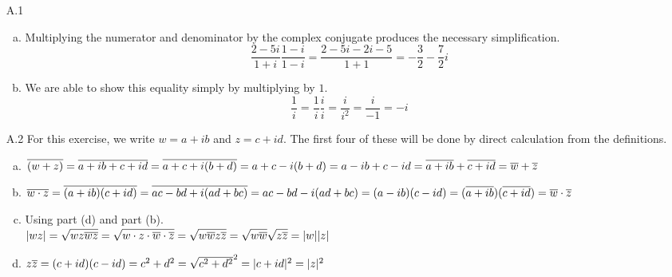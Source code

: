 \documentclass[../../Solutions.tex]{subfiles}
\begin{document}
\begin{itemize}
	\item [A.1]
		\begin{enumerate}[(a)]
			\item Multiplying the numerator and denominator by the complex conjugate produces the necessary simplification.
			$$ \frac{2-5i}{1+i}\frac{1-i}{1-i} = \frac{2-5i-2i-5}{1+1} = -\frac{3}{2}-\frac{7}{2}i $$
			
			\item We are able to show this equality simply by multiplying by $1$.
			$$ \frac{1}{i} = \frac{1}{i}\frac{i}{i} = \frac{i}{i^2} = \frac{i}{-1} = -i $$
		\end{enumerate}
		
	\item [A.2] For this exercise, we write $w = a+ib$ and $z = c+id$.
	The first four of these will be done by direct calculation from the definitions.
		\begin{enumerate}[(a)]
			\item $\overline{(w+z)} = \overline{a+ib+c+id} = \overline{a+c+i(b+d)} = a+c-i(b+d) = a-ib+c-id = \overline{a+ib}+\overline{c+id} = \overline{w}+\overline{z}$
			
			\item $\overline{w \cdot z} = \overline{(a+ib)(c+id)} = \overline{ac-bd+i(ad+bc)} = ac-bd-i(ad+bc) = (a-ib)(c-id) = (\overline{a+ib})(\overline{c+id}) = \overline{w} \cdot \overline{z}$
			
			\item Using part (d) and part (b). \\
			$|wz| = \sqrt{wz \overline{wz}} = \sqrt{w \cdot z \cdot \overline{w} \cdot \overline{z}} = \sqrt{w\overline{w}z\overline{z}} = \sqrt{w\overline{w}}\sqrt{z\overline{z}} = |w||z|$
			
			\item $z\overline{z} = (c+id)(c-id) = c^2+d^2 = \sqrt{c^2+d^2}^2 = |c+id|^2 = |z|^2$
			

\end{enumerate}
\end{itemize}
\end{document}
